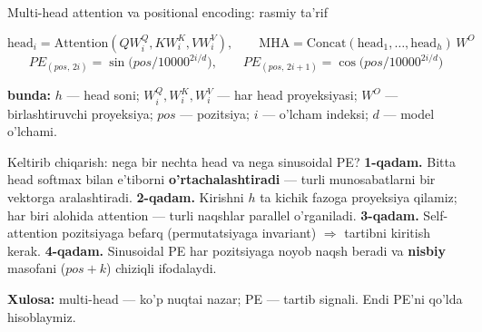 \documentclass[aspectratio=169,11pt]{beamer}
\newcommand{\bunda}[1]{{\small\textbf{bunda:}\; #1}}
\begin{document}
\begin{frame}{Multi-head attention va positional encoding: rasmiy ta'rif}
  \begin{tcolorbox}[defbox,title={Ta'rif: multi-head va PE}]
    \vspace{-0.4em}
    $$ \mathrm{head}_i = \mathrm{Attention}(QW_i^Q, KW_i^K, VW_i^V), \qquad
       \mathrm{MHA} = \mathrm{Concat}(\mathrm{head}_1,\ldots,\mathrm{head}_h)\,W^O $$
    \vspace{-0.6em}
    $$ PE_{(pos,\,2i)} = \sin\!\big(pos/10000^{2i/d}\big), \qquad
       PE_{(pos,\,2i+1)} = \cos\!\big(pos/10000^{2i/d}\big) $$
  \end{tcolorbox}
  \vspace{2pt}
  \bunda{$h$ --- head soni; $W_i^Q, W_i^K, W_i^V$ --- har head proyeksiyasi;
  $W^O$ --- birlashtiruvchi proyeksiya; $pos$ --- pozitsiya; $i$ --- o'lcham
  indeksi; $d$ --- model o'lchami.}
\end{frame}

\begin{frame}{Keltirib chiqarish: nega bir nechta head va nega sinusoidal PE?}
  \textbf{1-qadam.} Bitta head softmax bilan e'tiborni \textbf{o'rtachalashtiradi}
  --- turli munosabatlarni bir vektorga aralashtiradi.
  \pause
  \textbf{2-qadam.} Kirishni $h$ ta kichik fazoga proyeksiya qilamiz; har biri
  alohida attention --- turli naqshlar parallel o'rganiladi.
  \pause
  \textbf{3-qadam.} Self-attention pozitsiyaga befarq (permutatsiyaga
  invariant) $\Rightarrow$ tartibni kiritish kerak.
  \pause
  \textbf{4-qadam.} Sinusoidal PE har pozitsiyaga noyob naqsh beradi va
  \textbf{nisbiy} masofani ($pos{+}k$) chiziqli ifodalaydi.
  \begin{tcolorbox}[okbox,top=2pt,bottom=2pt]
    \small \textbf{Xulosa:} multi-head --- ko'p nuqtai nazar; PE --- tartib
    signali. Endi PE'ni qo'lda hisoblaymiz.
  \end{tcolorbox}
\end{frame}
\end{document}
